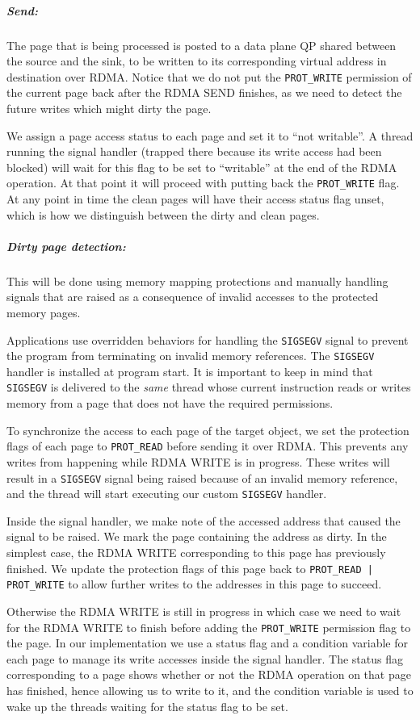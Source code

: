 \subparagraph{Send:} The page that is being processed is posted to a
data plane QP shared between the source and the sink, to be written to
its corresponding virtual address in destination over RDMA.
Notice that we do not put the \texttt{PROT\_WRITE} permission
of the current page back after the RDMA SEND finishes, as we need to
detect the future writes which might dirty the page.

We assign a page access status to each page and set it to ``not writable''. A
thread running the signal handler (trapped there because its write access had
been blocked) will wait for this flag to be set to ``writable''
at the end of the RDMA operation. At that point it will proceed with putting
back the \texttt{PROT\_WRITE} flag.
At any point in time the clean pages will have their access status flag unset,
which is how we distinguish between the dirty and clean pages.

\subparagraph{Dirty page detection:}
This will be done using memory mapping protections and manually
handling signals that
are raised as a consequence of invalid accesses to the protected memory pages.

Applications use overridden behaviors for handling the \texttt{SIGSEGV} signal
to prevent the program from terminating on invalid memory references.
The \texttt{SIGSEGV} handler is installed at program start.
It is important to keep in mind that
\texttt{SIGSEGV} is delivered
to the \emph{same} thread whose current instruction reads or writes memory
from a page that does not have the required permissions.

To synchronize the access to each page of the target object,
we set the protection flags of each page to \texttt{PROT\_READ} before sending
it over RDMA. This prevents any writes from happening while RDMA WRITE
is in progress. These writes will result in a \texttt{SIGSEGV} signal being
raised because of an invalid memory reference, and the thread will start
executing our custom \texttt{SIGSEGV} handler.

Inside the signal handler, we make note of the accessed address that
caused the signal to be raised. We mark the page containing the address as
dirty. In the simplest case, the RDMA WRITE corresponding to this page has
previously finished. We update the protection flags of this page back
to \texttt{PROT\_READ | PROT\_WRITE}
to allow further writes to the addresses in this page to succeed.

Otherwise the RDMA WRITE is still in progress in which case we need to wait for the
RDMA WRITE to finish before adding the \texttt{PROT\_WRITE} permission flag to
the page. In our
implementation we use a status flag and a condition variable for each page
to manage its write accesses inside the signal handler. The status flag
corresponding to a page shows whether or not the RDMA operation on that page
has finished, hence allowing us to write to it, and the condition variable
is used to wake up the threads waiting for the status flag to be set.


